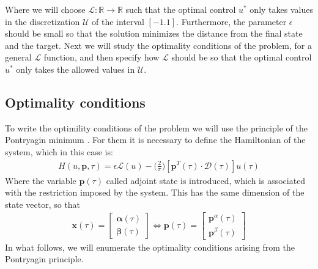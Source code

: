 Where we will choose $ \mathcal {L}: \mathbb {R} \rightarrow \mathbb {R} $ such that the optimal control $ u^* $ only takes values in the discretization $ \mathcal {U} $ of the interval $ [- 1.1] $. Furthermore, the parameter $ \epsilon $ should be small so that the solution minimizes the distance from the final state and the target.
%
Next we will study the optimality conditions of the problem, for a general $ \mathcal {L} $ function, and then specify how $ \mathcal {L} $ should be so that the optimal control $ u ^ * $ only takes the allowed values in $ \mathcal {U} $.

\subsection{Optimality conditions}

To write the optimility conditions of the problem we will use the principle of the Pontryagin minimum \cite[Chapter~2.7]{bryson1975applied}. For them it is necessary to define the Hamiltonian of the system, which in this case is:
\begin{gather}\label{hamil}
    H(u,\bm{p},\tau) = 
    \epsilon \mathcal{L}(u) -
    \bigg(\frac{2}{\pi}\bigg)[\bm{p}^T(\tau) \cdot \bm{\mathcal{D}}(\tau)]
    u(\tau)
\end{gather}
Where the variable $ \bm{p} (\tau) $ called adjoint state is introduced, which is associated with the restriction imposed by the system. This has the same dimension of the state vector, so that
\begin{gather}
        \bm{x}(\tau) = \begin{bmatrix}
            \bm{\alpha}(\tau) \\  \bm{\beta}(\tau)
        \end{bmatrix}   \Leftrightarrow
        \bm{p}(\tau) = \begin{bmatrix}
        \bm{p}^\alpha(\tau) \\ \bm{p}^\beta(\tau)
                \end{bmatrix}
\end{gather}
In what follows, we will enumerate the optimality conditions arising from the Pontryagin principle.

